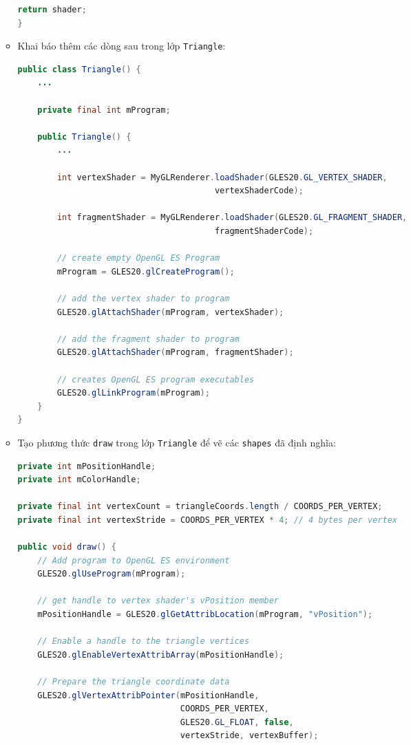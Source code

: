 \documentclass[13pt,a4paper]{extreport}
\begin{document}
\begin{itemize}
\begin{itemize}
\begin{lstlisting}[language=Java]
    return shader;
}					
					\end{lstlisting}
					
				\item Khai báo thêm các dòng sau trong lớp \verb|Triangle|:
					\begin{lstlisting}[language=Java]
public class Triangle() {
    ...

    private final int mProgram;

    public Triangle() {
        ...

        int vertexShader = MyGLRenderer.loadShader(GLES20.GL_VERTEX_SHADER,
                                        vertexShaderCode);
                                        
        int fragmentShader = MyGLRenderer.loadShader(GLES20.GL_FRAGMENT_SHADER,
                                        fragmentShaderCode);

        // create empty OpenGL ES Program
        mProgram = GLES20.glCreateProgram();

        // add the vertex shader to program
        GLES20.glAttachShader(mProgram, vertexShader);

        // add the fragment shader to program
        GLES20.glAttachShader(mProgram, fragmentShader);

        // creates OpenGL ES program executables
        GLES20.glLinkProgram(mProgram);
    }
}					
					\end{lstlisting}
				\item Tạo phương thức \verb|draw| trong lớp \verb|Triangle| để vẽ các \verb|shapes| đã định nghĩa:
					\begin{lstlisting}[language=Java]
private int mPositionHandle;
private int mColorHandle;

private final int vertexCount = triangleCoords.length / COORDS_PER_VERTEX;
private final int vertexStride = COORDS_PER_VERTEX * 4; // 4 bytes per vertex

public void draw() {
    // Add program to OpenGL ES environment
    GLES20.glUseProgram(mProgram);

    // get handle to vertex shader's vPosition member
    mPositionHandle = GLES20.glGetAttribLocation(mProgram, "vPosition");

    // Enable a handle to the triangle vertices
    GLES20.glEnableVertexAttribArray(mPositionHandle);

    // Prepare the triangle coordinate data
    GLES20.glVertexAttribPointer(mPositionHandle, 
                                 COORDS_PER_VERTEX,
                                 GLES20.GL_FLOAT, false,
                                 vertexStride, vertexBuffer);


\end{lstlisting}
\end{itemize}
\end{itemize}
\end{document}

